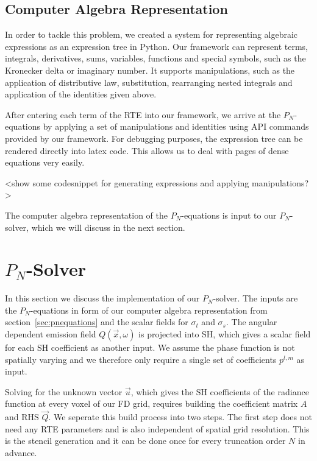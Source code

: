 \subsection*{Computer Algebra Representation}

In order to tackle this problem, we created a system for representing algebraic expressions as an expression tree in Python. Our framework can represent terms, integrals, derivatives, sums, variables, functions and special symbols, such as the Kronecker delta or imaginary number. It supports manipulations, such as the application of distributive law, substitution, rearranging nested integrals and application of the identities given above.

After entering each term of the RTE into our framework, we arrive at the $P_N$-equations by applying a set of manipulations and identities using API commands provided by our framework. For debugging purposes, the expression tree can be rendered directly into latex code. This allows us to deal with pages of dense equations very easily.

<show some codesnippet for generating expressions and applying manipulations?>

The computer algebra representation of the $P_N$-equations is input to our $P_N$-solver, which we will discuss in the next section.

\section{$P_N$-Solver}
\label{sec:pnsolver}

In this section we discuss the implementation of our $P_N$-solver. The inputs are the $P_N$-equations in form of our computer algebra representation from section~\ref{sec:pnequations} and the scalar fields for $\sigma_t$ and $\sigma_s$. The angular dependent emission field $Q\left(\vec{x}, \omega\right)$ is projected into SH, which gives a scalar field for each SH coefficient as another input. We assume the phase function is not spatially varying and we therefore only require a single set of coefficients $p^{l,m}$ as input.

Solving for the unknown vector $\vec{u}$, which gives the SH coefficients of the radiance function at every voxel of our FD grid, requires building the coefficient matrix $A$ and RHS $\vec{Q}$. We seperate this build process into two steps. The first step does not need any RTE parameters and is also independent of spatial grid resolution. This is the stencil generation and it can be done once for every truncation order $N$ in advance.

